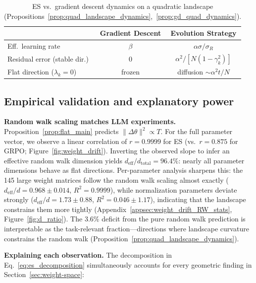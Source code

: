 \begin{table}[H]
\centering
\footnotesize
\caption{ES vs.\ gradient descent dynamics on a quadratic landscape (Propositions~\ref{prop:quad_landscape_dynamics},~\ref{prop:gd_quad_dynamics}).}
\label{tab:es_vs_gd}
\begin{tabular}{lcc}
\toprule
 & \textbf{Gradient Descent} & \textbf{Evolution Strategy} \\
\midrule
Eff.\ learning rate & $\beta$ & $\alpha\sigma/\sigma_R$ \\
Residual error (stable dir.) & $0$ & $\alpha^2/[N(1-\gamma_k^2)]$ \\
Flat direction ($\lambda_k{=}0$) & frozen & diffusion $\sim \alpha^2 t/N$ \\
\bottomrule
\end{tabular}
\end{table}


\subsection{Empirical validation and explanatory power}

\textbf{Random walk scaling matches LLM experiments.}
Proposition~\ref{prop:flat_main} predicts $\|\Delta\theta\|^2 \propto T$. For the full parameter vector, we observe a linear correlation of $r = 0.9999$ for ES (vs.\ $r = 0.875$ for GRPO; Figure~\ref{fig:weight_drift}). Inverting the observed slope to infer an effective random walk dimension yields $d_{\mathrm{eff}} / d_{\mathrm{total}} = 96.4\%$: nearly all parameter dimensions behave as flat directions.
Per-parameter analysis sharpens this: the 145 large weight matrices follow the random walk scaling almost exactly ($d_{\mathrm{eff}}/d = 0.968 \pm 0.014$, $R^2 = 0.9999$), while normalization parameters deviate strongly ($d_{\mathrm{eff}}/d = 1.73 \pm 0.88$, $R^2 = 0.046 \pm 1.17$), indicating that the landscape constrains them more tightly (Appendix~\ref{appsec:weight_drift_RW_stats}, Figure~\ref{fig:d_ratio}).
The $3.6\%$ deficit from the pure random walk prediction is interpretable as the task-relevant fraction---directions where landscape curvature constrains the random walk (Proposition~\ref{prop:quad_landscape_dynamics}).

\textbf{Explaining each observation.}
The decomposition in Eq.~\eqref{eq:es_decomposition} simultaneously accounts for every geometric finding in Section~\ref{sec:weight-space}:

